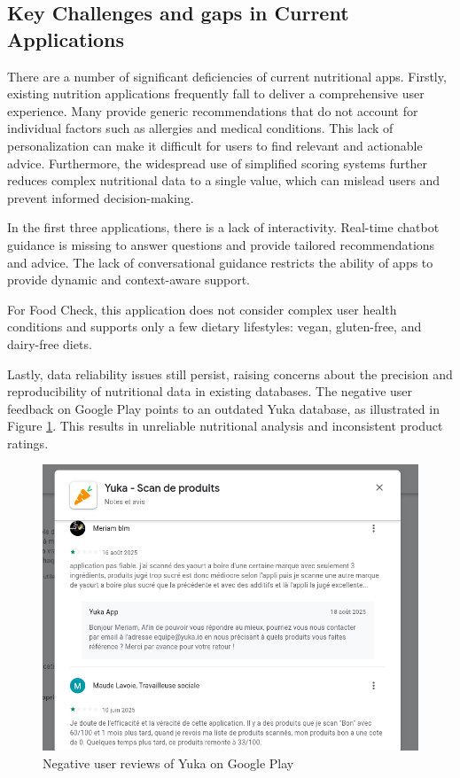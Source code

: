 \subsection{Key Challenges and gaps in Current Applications}
There are a number of significant deficiencies of current nutritional apps. Firstly, existing nutrition applications frequently fall to deliver a comprehensive user experience. Many provide generic recommendations that do not account for individual factors such as allergies and medical conditions. This lack of personalization can make it difficult for users to find relevant and actionable advice. Furthermore, the widespread use of simplified scoring systems further reduces complex nutritional data to a single value, which can mislead users and prevent informed decision-making.  

In the first three applications, there is a lack of interactivity. Real-time chatbot guidance is missing to answer questions and provide tailored recommendations and advice. The lack of conversational guidance restricts the ability of apps to provide dynamic and context-aware support. 

For Food Check, this application does not consider complex user health conditions and supports only a few dietary lifestyles: vegan, gluten-free, and dairy-free diets.  


 Lastly, data reliability issues still persist, raising concerns about the precision and reproducibility of nutritional data in existing databases. The negative user feedback on Google Play points to an outdated Yuka database, as illustrated in Figure \ref{fig:yuka_feedback}. This results in unreliable nutritional analysis and inconsistent product ratings.  

\begin{center}
\begin{figure}[ht]
\includegraphics[scale=0.45]{images/yuka_negative_review.png}
\caption{Negative user reviews of Yuka on Google Play}
\label{fig:yuka_feedback}
\end{figure}
\end{center}


